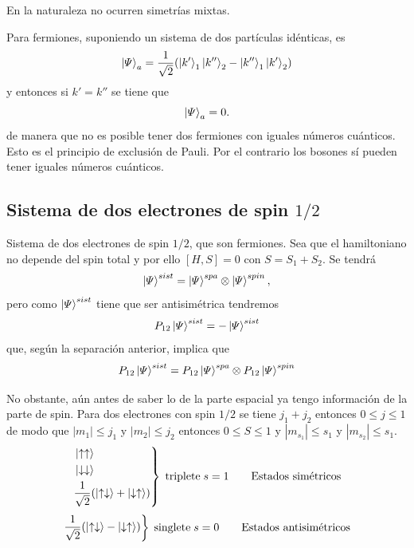 \documentclass[10pt,oneside]{CBFT_book}
\begin{document}
En la naturaleza no ocurren simetrías mixtas.


Para fermiones, suponiendo un sistema de dos partículas idénticas, es
\[
	\Ket{ \Psi }_a = \frac{1}{\sqrt{2}}( \Ket{k'}_1\Ket{k''}_2 - \Ket{k''}_1\Ket{k'}_2)
\]
y entonces si $k'=k''$ se tiene que 
\[
	\Ket{ \Psi }_a = 0.
\]
de manera que no es posible tener dos fermiones con iguales números cuánticos.
Esto es el principio de exclusión de Pauli. 
Por el contrario los bosones sí pueden tener iguales números cuánticos.



\subsection{Sistema de dos electrones de spin $1/2$}

Sistema de dos electrones de spin $1/2$, que son fermiones. Sea que el hamiltoniano
no depende del spin total y por ello $[H,S]=0$  con $S = S_1 + S_2$. Se tendrá 
\[
	\Ket{\Psi}^{sist} = \Ket{\Psi}^{spa} \otimes \Ket{\Psi}^{spin},
\]
pero como $\Ket{\Psi}^{sist}$ tiene que ser antisimétrica tendremos 
\[
	P_{12} \Ket{\Psi}^{sist} = - \Ket{\Psi}^{sist} 
\]
que, según la separación anterior, implica que 
\[
	P_{12} \Ket{\Psi}^{sist} = P_{12} \Ket{\Psi}^{spa} \otimes P_{12}\Ket{\Psi}^{spin} 
\]

No obstante, aún antes de saber lo de la parte espacial ya tengo información de la
parte de spin.
Para dos electrones con spin $1/2$ se tiene $j_1+j_2$ entonces $ 0 \leq j \leq 1 $ de modo que $|m_1|\leq j_1$ y
$|m_2|\leq j_2$ entonces $0 \leq S \leq 1$ y $|m_{s_1}|\leq s_1$ y $|m_{s_2}|\leq s_1$.
\[
	\left.\begin{aligned}
	& \Ket{\uparrow \uparrow} \\
	& \Ket{\downarrow \downarrow } \\
	& \frac{1}{\sqrt{2}}( \Ket{ \uparrow\downarrow }+\Ket{ \downarrow\uparrow} )
	\end{aligned}
	\right\} \; \text{triplete} \; s=1 \qquad \text{Estados simétricos}
\]
\[
	\left.\begin{aligned}
	\frac{1}{\sqrt{2}}( \Ket{\uparrow\downarrow} - \Ket{\downarrow\uparrow} )
	\end{aligned}
	\right\} \; \text{singlete} \; s=0 \qquad \text{Estados antisimétricos}
\]
\end{document}
